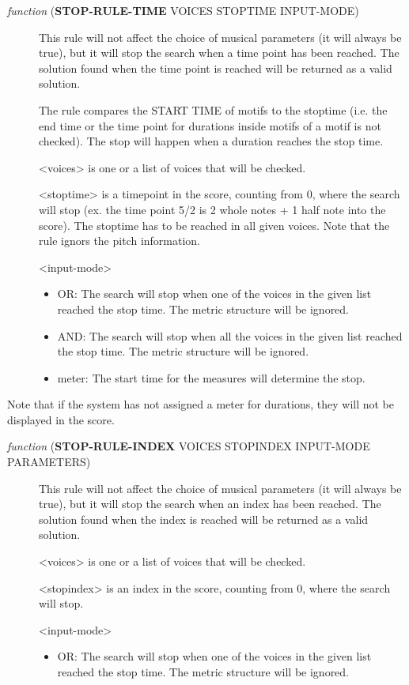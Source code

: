 \begin{description}
\item[{ \emph{function} (\textbf{STOP-RULE-TIME} VOICES STOPTIME INPUT-MODE)}] This rule will not affect the choice of musical parameters (it will always be true), but it will stop the search when a time point has been reached. The solution found when the time point is reached will be returned as a valid solution.

The rule compares the START TIME of motifs to the stoptime (i.e. the end time or the time point for durations inside motifs of a motif is not checked). The stop will happen when a duration reaches the stop time.

<voices> is one or a list of voices that will be checked.

<stoptime> is a timepoint in the score, counting from 0, where the search will stop (ex. the time point 5/2 is 2 whole notes + 1 half note into the score). The stoptime has to be reached in all given voices. Note that the rule ignors the pitch information.

<input-mode>

\begin{itemize}
\item OR: The search will stop when one of the voices in the given list reached the stop time. The metric structure will be ignored.
\item AND: The search will stop when all the voices in the given list reached the stop time. The metric structure will be ignored.
\item meter: The start time for the measures will determine the stop.
\end{itemize}
\end{description}


Note that if the system has not assigned a meter for durations, they will not be displayed in the score.




\begin{description}
\item[{ \emph{function} (\textbf{STOP-RULE-INDEX} VOICES STOPINDEX INPUT-MODE PARAMETERS)}] This rule will not affect the choice of musical parameters (it will always be true), but it will stop the search when an index has been reached. The solution found when the index is reached will be returned as a valid solution.

<voices> is one or a list of voices that will be checked.

<stopindex> is an index in the score, counting from 0, where the search will stop.

<input-mode>

\begin{itemize}
\item OR: The search will stop when one of the voices in the given list reached the stop time. The metric structure will be ignored.
\end{itemize}
\end{description}





